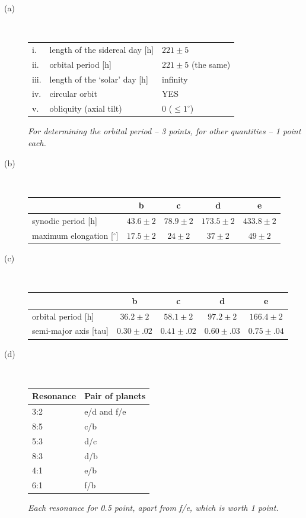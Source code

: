 \begin{description}
\item[(a)]~
\begin{center}
\begin{tabular}{lll}
\toprule
i. & length of the sidereal day [h] & $221\pm5$\\
ii. & orbital period [h] & $221\pm5$ (the same)\\
iii. & length of the `solar' day [h] & infinity\\
iv. & circular orbit & YES\\
v. & obliquity (axial tilt) & $0$ ($\le1^\circ$)\\
\bottomrule
\end{tabular}
\end{center}
\textit{For determining the orbital period -- 3 points, for other quantities
-- 1 point each.}

\item[(b)]~
\begin{center}
\begin{tabular}{lcccc}
\toprule
 & b & c & d & e\\
\midrule
synodic period [h] & $43.6\pm2$ & $78.9\pm2$ & $173.5\pm2$ & $433.8\pm2$\\
maximum elongation [$^\circ$] & $17.5\pm2$ & $24\pm2$ & $37\pm2$ & $49\pm2$\\
\bottomrule
\end{tabular}
\end{center}

\item[(c)]~
\begin{center}
\begin{tabular}{lcccc}
\toprule
 & b & c & d & e\\
\midrule
orbital period [h] & $36.2\pm2$ & $58.1\pm2$ & $97.2\pm2$ & $166.4\pm2$\\
semi-major axis [tau] & $0.30\pm.02$ & $0.41\pm.02$ & $0.60\pm.03$
  & $0.75\pm.04$\\
\bottomrule
\end{tabular}
\end{center}

\item[(d)]~
\begin{center}
\begin{tabular}{ll}
\toprule
Resonance & Pair of planets\\
\midrule
3:2 & e/d and f/e\\
8:5 & c/b\\
5:3 & d/c\\
8:3 & d/b\\
4:1 & e/b\\
6:1 & f/b\\
\bottomrule
\end{tabular}
\end{center}
\textit{Each resonance for 0.5 point, apart from f/e, which is worth 1
point.}
\end{description}

